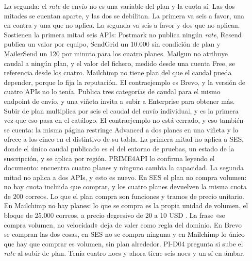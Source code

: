 La segunda: el \textit{rate} de envío no es una variable del plan y la cuota sí.
Las dos mitades se cuentan aparte, y las dos se debilitan.
La primera va seis a favor, una en contra y una que no aplica.
La segunda va seis a favor y dos que no aplican.
Sostienen la primera mitad seis APIs: Postmark no publica ningún \textit{rate}, Resend publica un valor por equipo, SendGrid un 10.000 sin condición de plan y MailerSend un 120 por minuto para los cuatro planes.
Mailgun no atribuye caudal a ningún plan, y el valor del fichero, medido desde una cuenta Free, se referencia desde los cuatro.
Mailchimp no tiene plan del que el caudal pueda depender, porque lo fija la reputación.
El contraejemplo es Brevo, y la versión de cuatro APIs no lo tenía.
Publica tres categorías de caudal para el mismo endpoint de envío, y una viñeta invita a subir a Enterprise para obtener más.
Subir de plan multiplica por seis el caudal del envío individual, y es la primera vez que eso pasa en el catálogo.
El contraejemplo no está cerrado, y eso también se cuenta: la misma página restringe Advanced a dos planes en una viñeta y lo ofrece a los cinco en el distintivo de su tabla.
La primera mitad no aplica a SES, donde el único caudal publicado es el del entorno de pruebas, un estado de la suscripción, y se aplica por región.
PRIME4API lo confirma leyendo el documento: encuentra cuatro planes y ninguno cambia la capacidad.
La segunda mitad no aplica a dos APIs, y esto es nuevo.
En SES el plan no compra volumen: no hay cuota incluida que comprar, y los cuatro planes devuelven la misma cuota de 200 correos.
Lo que el plan compra son funciones y tramos de precio unitario.
En Mailchimp no hay planes: lo que se compra es la propia unidad de volumen, el bloque de 25.000 correos, a precio degresivo de 20 a 10 USD \citep{mailchimppricing}.
La frase «se compra volumen, no velocidad» deja de valer como regla del dominio.
En Brevo se compran las dos cosas, en SES no se compra ninguna y en Mailchimp lo único que hay que comprar es volumen, sin plan alrededor.
PI-D04 pregunta si sube el \textit{rate} al subir de plan.
Tenía cuatro noes y ahora tiene seis noes y un sí en ámbar.

